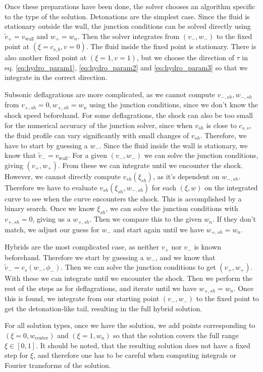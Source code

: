 Once these preparations have been done,
the solver chooses an algorithm specific to the type of the solution.
Detonations are the simplest case.
Since the fluid is stationary outside the wall,
the junction conditions can be solved directly using
$\tilde{v}_+ = v_\text{wall}$ and $w_+ = w_n$.
Then the solver integrates from $(v_-, w_-)$ to the fixed point at $(\xi=c_{s,b}, v=0)$.
The fluid inside the fixed point is stationary.
There is also another fixed point at $(\xi=1, v=1)$, but we choose the direction of $\tau$ in eq. \eqref{eq:hydro_param1}, \eqref{eq:hydro_param2} and \eqref{eq:hydro_param3} so that we integrate in the correct direction.

Subsonic deflagrations are more complicated,
as we cannot compute $v_{-,sh}, w_{-,sh}$ from $v_{+,sh}=0, w_{+,sh}=w_n$ using the junction conditions,
since we don't know the shock speed beforehand.
For some deflagrations, the shock can also be too small for the numerical accuracy of the junction solver,
since when $v_{sh}$ is close to $c_{s,s}$, the fluid profile can vary significantly with small changes of $v_{sh}$.
Therefore, we have to start by guessing a $w_-$.
Since the fluid inside the wall is stationary, we know that $\tilde{v}_- = v_{\text{wall}}$.
For a given $(v_-, w_-)$ we can solve the junction conditions, giving $(v_+, w_+)$.
From these we can integrate until we encounter the shock.
However, we cannot directly compute $v_{sh}(\xi_{sh})$, as it's dependent on $w_{-,sh}$.
Therefore we have to evaluate $v_{sh}(\xi_{sh}, w_{-,sh})$ for each $(\xi, w)$ on the integrated curve to see
when the curve encounters the shock.
This is accomplished by a binary search.
Once we know $\xi_{sh}$, we can solve the junction conditions with $v_{+,sh} = 0$, giving us a $w_{+,sh}$.
Then we compare this to the given $w_n$.
If they don't match, we adjust our guess for $w_-$ and start again until we have $w_{+,sh} = w_n$.

Hybrids are the most complicated case, as neither $v_+$ nor $v_-$ is known beforehand.
Therefore we start by guessing a $w_-$, and we know that $\tilde{v}_- = c_s(w_-, \phi_-)$.
Then we can solve the junction conditions to get $(v_+, w_+)$.
With these we can integrate until we encounter the shock.
Then we perform the rest of the steps as for deflagrations, and iterate until we have $w_{+,sh} = w_n$.
Once this is found, we integrate from our starting point $(v_-, w_-)$ to the fixed point to get the detonation-like tail,
resulting in the full hybrid solution.

For all solution types, once we have the solution,
we add points corresponding to $(\xi=0, w_\text{center})$ and $(\xi=1, w_n)$
so that the solution covers the full range $\xi \in [0, 1]$.
It should be noted, that the resulting solution does not have a fixed step for $\xi$,
and therefore one has to be careful when computing integrals or Fourier transforms of the solution.

